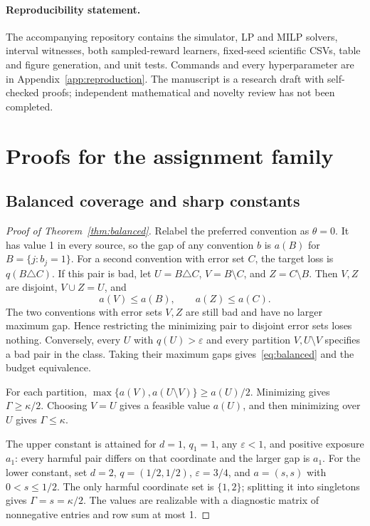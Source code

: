 \documentclass[11pt]{article}
\theoremstyle{definition}\newtheorem{definition}[theorem]{Definition}
\newcommand{\1}{\mathbf{1}}
\newcommand{\Gam}{\Gamma}
\newcommand{\eps}{\varepsilon}
\begin{document}
\paragraph{Reproducibility statement.}
The accompanying repository contains the simulator, LP and MILP solvers, interval witnesses, both sampled-reward learners, fixed-seed scientific CSVs, table and figure generation, and unit tests. Commands and every hyperparameter are in Appendix~\ref{app:reproduction}. The manuscript is a research draft with self-checked proofs; independent mathematical and novelty review has not been completed.



\clearpage\appendix

\section{Proofs for the assignment family}\label{app:balanced}
\subsection{Balanced coverage and sharp constants}
\begin{proof}[Proof of Theorem~\ref{thm:balanced}]
Relabel the preferred convention as $\theta=0$. It has value 1 in every source, so the gap of any convention $b$ is $a(B)$ for $B=\{j:b_j=1\}$. For a second convention with error set $C$, the target loss is $q(B\triangle C)$. If this pair is bad, let $U=B\triangle C$, $V=B\setminus C$, and $Z=C\setminus B$. Then $V,Z$ are disjoint, $V\cup Z=U$, and
\begin{equation*}
 a(V)\leq a(B),\qquad a(Z)\leq a(C).
\end{equation*}
The two conventions with error sets $V,Z$ are still bad and have no larger maximum gap. Hence restricting the minimizing pair to disjoint error sets loses nothing. Conversely, every $U$ with $q(U)>\eps$ and every partition $V,U\setminus V$ specifies a bad pair in the class. Taking their maximum gaps gives~\eqref{eq:balanced} and the budget equivalence.

For each partition, $\max\{a(V),a(U\setminus V)\}\geq a(U)/2$. Minimizing gives $\Gam\geq\kappa/2$. Choosing $V=U$ gives a feasible value $a(U)$, and then minimizing over $U$ gives $\Gam\leq\kappa$.

The upper constant is attained for $d=1$, $q_1=1$, any $\eps<1$, and positive exposure $a_1$: every harmful pair differs on that coordinate and the larger gap is $a_1$. For the lower constant, set $d=2$, $q=(1/2,1/2)$, $\eps=3/4$, and $a=(s,s)$ with $0<s\leq1/2$. The only harmful coordinate set is $\{1,2\}$; splitting it into singletons gives $\Gam=s=\kappa/2$. The values are realizable with a diagnostic matrix of nonnegative entries and row sum at most 1.
\end{proof}
\end{document}
